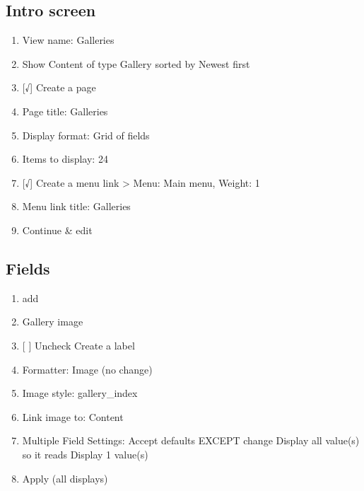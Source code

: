 \documentclass[letterpaper,10pt,english]{sphinxmanual}
\begin{document}
\subsection{Intro screen}
\label{slideshows:intro-screen}\begin{enumerate}
\item {} 
View name: Galleries

\item {} 
Show Content of type Gallery sorted by Newest first

\item {} 
{[}√{]}  Create a page

\item {} 
Page title: Galleries

\item {} 
Display format: Grid of fields

\item {} 
Items to display: 24

\item {} 
{[}√{]}  Create a menu link \textgreater{} Menu: Main menu, Weight: 1

\item {} 
Menu link title: Galleries

\item {} 
Continue \& edit

\end{enumerate}


\subsection{Fields}
\label{slideshows:fields}\begin{enumerate}
\item {} 
add

\item {} 
Gallery image

\item {} 
{[} {]} Uncheck Create a label

\item {} 
Formatter: Image (no change)

\item {} 
Image style: gallery\_index

\item {} 
Link image to: Content

\item {} 
Multiple Field Settings: Accept defaults EXCEPT change Display all value(s) so it reads Display 1 value(s)

\item {} 
Apply (all displays)

\end{enumerate}
\end{document}
